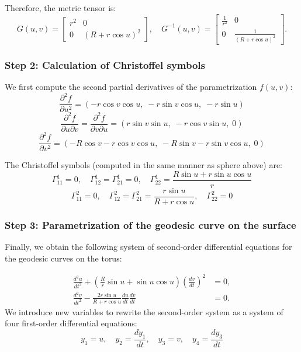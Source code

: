 \documentclass{article}
\begin{document}
			Therefore, the metric tensor is:
			\[
			G(u, v) =
			\begin{bmatrix}
				r^2 & 0 \\
				0 & (R + r \cos u)^2
			\end{bmatrix},
			\quad
			G^{-1}(u, v) =
			\begin{bmatrix}
				\frac{1}{r^2} & 0 \\
				0 & \frac{1}{(R + r \cos u)^2}
			\end{bmatrix}.
			\]

			\subsubsection{Step 2: Calculation of Christoffel symbols}

			We first compute the second partial derivatives of the parametrization \( f(u,v) \):
			\[
			\frac{\partial^2 f}{\partial u^2} = (-r \cos v \cos u,\; -r \sin v \cos u,\; -r \sin u)
			\]
			\[
			\frac{\partial^2 f}{\partial u \partial v} = \frac{\partial^2 f}{\partial v \partial u} = (r \sin v \sin u,\; -r \cos v \sin u,\; 0)
			\]
			\[
			\frac{\partial^2 f}{\partial v^2} = (-R \cos v - r \cos v \cos u,\; -R \sin v - r \sin v \cos u,\; 0)
			\]
			
			The Christoffel symbols (computed in the same manner as sphere above) are:
			\[
			\Gamma^1_{11} = 0,\quad
			\Gamma^1_{12} = \Gamma^1_{21} = 0,\quad
			\Gamma^1_{22} = \frac{R \sin u + r \sin u \cos u}{r}
			\]
			\[
			\Gamma^2_{11} = 0,\quad
			\Gamma^2_{12} = \Gamma^2_{21} = \frac{r \sin u}{R + r \cos u},\quad
			\Gamma^2_{22} = 0
			\]
			
			
			\subsubsection{Step 3: Parametrization of the geodesic curve on the surface}
			Finally, we obtain the following system of second-order differential equations for the geodesic curves on the torus:
			
			\begin{align*}
				\frac{d^2 u}{dt^2} + \left( \frac{R}{r} \sin u + \sin u \cos u \right) \left( \frac{dv}{dt} \right)^2 &= 0, \\
				\frac{d^2 v}{dt^2} - \frac{2r \sin u}{R + r \cos u} \frac{du}{dt} \frac{dv}{dt} &= 0.
			\end{align*}
			We introduce new variables to rewrite the second-order system as a system of four first-order differential equations:
			\[
			y_1 = u, \quad y_2 = \frac{dy_1}{dt}, \quad y_3 = v, \quad y_4 = \frac{dy_3}{dt}
			\]
			
\end{document}

